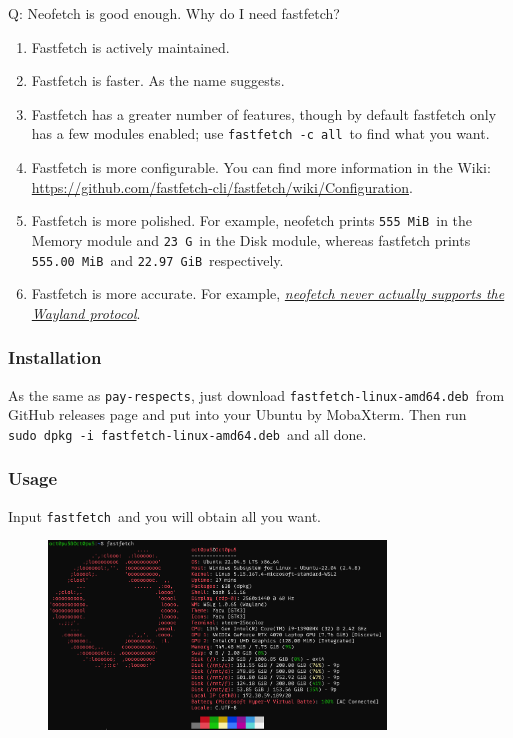 \documentclass[12pt]{ctexart}
\newenvironment{mdquote}
{%
  \par\noindent
  \begin{list}{}{%
      \setlength{\leftmargin}{1em}%
      \setlength{\rightmargin}{0pt}%
      \setlength{\itemindent}{0pt}%
      \setlength{\listparindent}{\parindent}%
      \setlength{\topsep}{0.5\baselineskip}%
  }
  \item[\textbf{>}\ ]\itshape
}
{\end{list}\par}
\begin{document}
\begin{mdquote}
Q: Neofetch is good enough. Why do I need fastfetch?

\begin{enumerate}
\def\labelenumi{\arabic{enumi}.}
\setlength{\itemsep}{0pt}
\setlength{\parskip}{0pt}
\item
  Fastfetch is actively maintained.
\item
  Fastfetch is faster. As the name suggests.
\item
  Fastfetch has a greater number of features, though by default
  fastfetch only has a few modules enabled;
  use \texttt{fastfetch\ -c\ all}\ to find what you want.
\item
  Fastfetch is more configurable. You can find more information in the
  Wiki: \url{https://github.com/fastfetch-cli/fastfetch/wiki/Configuration}.
\item
  Fastfetch is more polished. For example, neofetch
  prints \texttt{555\ MiB}\ in the Memory module and \texttt{23\ G}\ in
  the Disk module, whereas fastfetch
  prints \texttt{555.00\ MiB}\ and \texttt{22.97\ GiB}\ respectively.
\item
  Fastfetch is more accurate. For
  example, \href{https://github.com/dylanaraps/neofetch/pull/2395}{\textit{neofetch
  never actually supports the Wayland protocol}}.
\end{enumerate}
\end{mdquote}

\subsubsection*{\textbf{Installation}}

As the same as \texttt{pay-respects}, just download
\texttt{fastfetch-linux-amd64.deb}\ from GitHub releases page and put
into your Ubuntu by MobaXterm. Then run
\texttt{sudo\ dpkg\ -i\ fastfetch-linux-amd64.deb}\ and all done.

\subsubsection*{\textbf{Usage}}

Input \texttt{fastfetch}\ and you will obtain all you want.

\begin{figure}[H]
    \centering
    \includegraphics[width=0.8\textwidth,keepaspectratio]{assets/Linux/2.6 The way to pretend B/2.png}
\end{figure}
\end{document}
